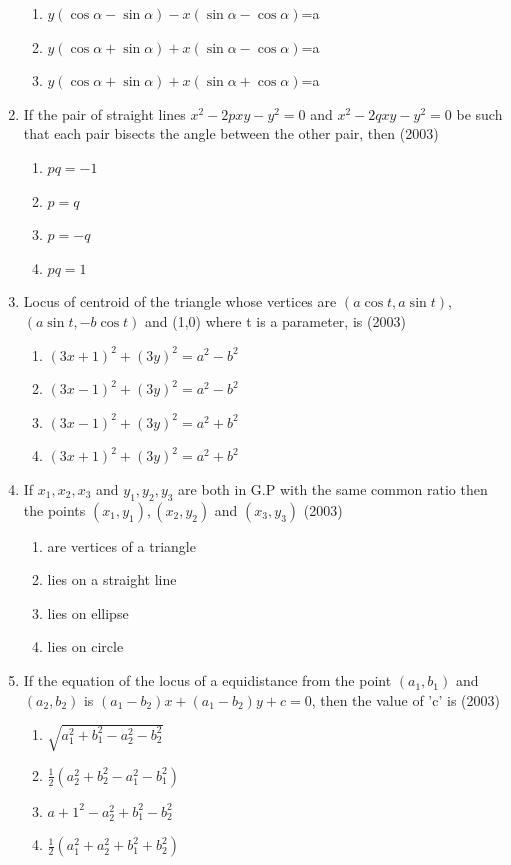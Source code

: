 \documentclass[12pt]{article}
\begin{document}
\begin{enumerate}
\begin{enumerate}
\item $y(\cos\alpha-\sin\alpha)-x(\sin\alpha-\cos\alpha)$=a
\item $y(\cos\alpha+\sin\alpha)+x(\sin\alpha-\cos\alpha)$=a
\item $y(\cos\alpha+\sin\alpha)+x(\sin\alpha+\cos\alpha)$=a
\end{enumerate}
\item If the pair of straight lines $x^2-2pxy-y^2=0$ and $x^2-2qxy-y^2=0$ be such that each pair bisects the angle between the other pair, then (2003)
\begin{enumerate}
\item $pq=-1$  
\item $p=q$ 
\item $p=-q$  
\item $pq=1$
\end{enumerate}
\item Locus of centroid of the triangle whose vertices are $(a\cos t, a\sin t)$, $(a\sin t,-b\cos t)$ and (1,0) where t is a parameter, is (2003)
\begin{enumerate}
\item $(3x+1)^2+(3y)^2=a^2-b^2$
\item $(3x-1)^2+(3y)^2=a^2-b^2$
\item $(3x-1)^2+(3y)^2=a^2+b^2$
\item $(3x+1)^2+(3y)^2=a^2+b^2$
\end{enumerate}
\item If $x_1,x_2,x_3$ and $y_1,y_2,y_3$ are both in G.P with the same common ratio then the points $(x_1,y_1),(x_2,y_2)$ and $(x_3,y_3)$ (2003)
\begin{enumerate}
\item are vertices of a triangle
\item lies on a straight line
\item lies on ellipse
\item lies on circle
\end{enumerate}
\item If the equation of the locus of a equidistance from the point $(a_1,b_1)$ and $(a_2,b_2)$ is $(a_1-b_2)x+(a_1-b_2)y+c=0$, then the value of 'c' is (2003)
\begin{enumerate}
\item $\sqrt{a_1^2+b_1^2-a_2^2-b_2^2}$
\item $\frac{1}{2}(a_2^2+b_2^2-a_1^2-b_1^2)$
\item $a+1^2-a_2^2+b_1^2-b_2^2$
\item $\frac{1}{2}(a_1^2+a_2^2+b_1^2+b_2^2)$

\end{enumerate}
\end{enumerate}
\end{document}
